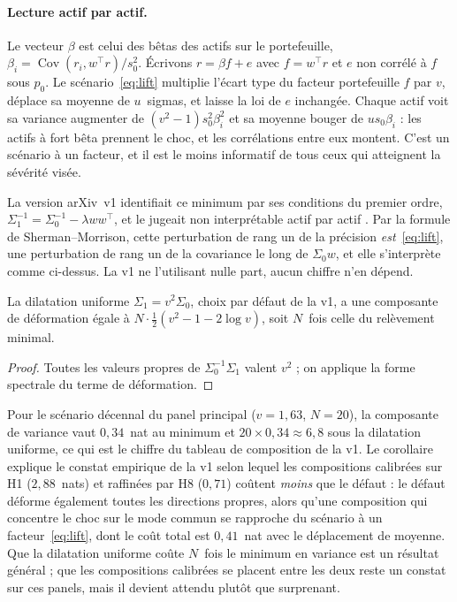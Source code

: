 \paragraph{Lecture actif par actif.} Le vecteur $\beta$ est celui des bêtas des
actifs sur le portefeuille, $\beta_i=\operatorname{Cov}(r_i,w^\top r)/s_0^2$.
Écrivons $r=\beta f+e$ avec $f=w^\top r$ et $e$ non corrélé à $f$ sous $p_0$.
Le scénario~\eqref{eq:lift} multiplie l'écart type du facteur portefeuille $f$
par $v$, déplace sa moyenne de $u$~sigmas, et laisse la loi de $e$ inchangée.
Chaque actif voit sa variance augmenter de $(v^2-1)s_0^2\beta_i^2$ et sa
moyenne bouger de $us_0\beta_i$ : les actifs à fort bêta prennent le choc, et
les corrélations entre eux montent. C'est un scénario à un facteur, et il est
le moins informatif de tous ceux qui atteignent la sévérité visée.

\begin{remark}[Correction de la v1]
La version arXiv~v1 identifiait ce minimum par ses conditions du premier ordre,
$\Sigma_1^{-1}=\Sigma_0^{-1}-\lambda ww^\top$, et le jugeait \og non
interprétable actif par actif \fg{}. Par la formule de Sherman--Morrison, cette
perturbation de rang un de la précision \emph{est}~\eqref{eq:lift}, une
perturbation de rang un de la covariance le long de $\Sigma_0w$, et elle
s'interprète comme ci-dessus. La v1 ne l'utilisant nulle part, aucun chiffre
n'en dépend.
\end{remark}

\begin{corollary}
\label{cor:uniform}
La dilatation uniforme $\Sigma_1=v^2\Sigma_0$, choix par défaut de la v1, a une
composante de déformation égale à $N\cdot\tfrac12(v^2-1-2\log v)$, soit $N$~fois
celle du relèvement minimal.
\end{corollary}

\begin{proof}
Toutes les valeurs propres de $\Sigma_0^{-1}\Sigma_1$ valent $v^2$ ; on applique
la forme spectrale du terme de déformation.
\end{proof}

Pour le scénario décennal du panel principal ($v=1{,}63$, $N=20$), la
composante de variance vaut $0{,}34$~nat au minimum et $20\times0{,}34\approx6{,}8$
sous la dilatation uniforme, ce qui est le chiffre du tableau de composition de
la v1. Le corollaire explique le constat empirique de la v1 selon lequel les
compositions calibrées sur H1 ($2{,}88$~nats) et raffinées par H8 ($0{,}71$)
coûtent \emph{moins} que le défaut : le défaut déforme également toutes les
directions propres, alors qu'une composition qui concentre le choc sur le mode
commun se rapproche du scénario à un facteur~\eqref{eq:lift}, dont le coût total
est $0{,}41$~nat avec le déplacement de moyenne. Que la dilatation uniforme
coûte $N$~fois le minimum en variance est un résultat général ; que les
compositions calibrées se placent entre les deux reste un constat sur ces
panels, mais il devient attendu plutôt que surprenant.

